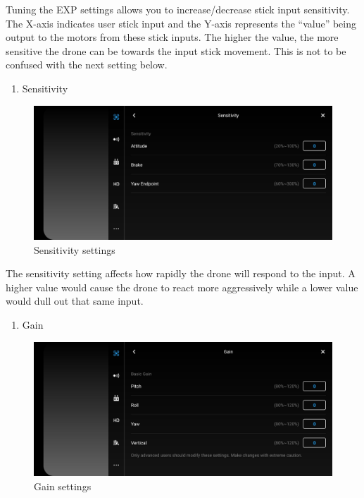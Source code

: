 \documentclass[
]{book}
\providecommand{\tightlist}{%
  \setlength{\itemsep}{0pt}\setlength{\parskip}{0pt}}
\begin{document}
Tuning the EXP settings allows you to increase/decrease stick input sensitivity. The X-axis indicates user stick input and the Y-axis represents the ``value'' being output to the motors from these stick inputs. The higher the value, the more sensitive the drone can be towards the input stick movement. This is not to be confused with the next setting below.

\begin{enumerate}
\def\labelenumi{\arabic{enumi}.}
\setcounter{enumi}{1}
\tightlist
\item
  Sensitivity
\end{enumerate}

\begin{figure}
\centering
\includegraphics{images/MC/DJI-SensitivitySettings.jpg}
\caption{Sensitivity settings}
\end{figure}

The sensitivity setting affects how rapidly the drone will respond to the input. A higher value would cause the drone to react more aggressively while a lower value would dull out that same input.

\begin{enumerate}
\def\labelenumi{\arabic{enumi}.}
\setcounter{enumi}{2}
\tightlist
\item
  Gain
\end{enumerate}

\begin{figure}
\centering
\includegraphics{images/MC/DJI-GainSettings.jpg}
\caption{Gain settings}
\end{figure}
\end{document}
